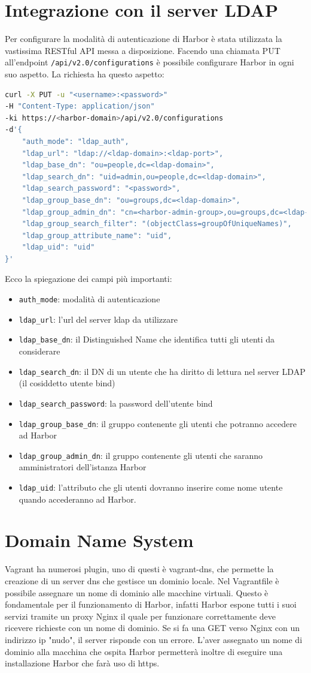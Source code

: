 \documentclass[12pt]{report}
\begin{document}
\section{Integrazione con il server LDAP}
Per configurare la modalità di autenticazione di Harbor è stata utilizzata la vastissima RESTful API messa a disposizione. 
Facendo una chiamata PUT all'endpoint \texttt{/api/v2.0/configurations} è possibile configurare Harbor in ogni suo aspetto. La richiesta ha questo aspetto:
\begin{lstlisting}[language=bash]
curl -X PUT -u "<username>:<password>" 
-H "Content-Type: application/json" 
-ki https://<harbor-domain>/api/v2.0/configurations 
-d'{
    "auth_mode": "ldap_auth",
    "ldap_url": "ldap://<ldap-domain>:<ldap-port>",
    "ldap_base_dn": "ou=people,dc=<ldap-domain>",
    "ldap_search_dn": "uid=admin,ou=people,dc=<ldap-domain>",
    "ldap_search_password": "<password>",
    "ldap_group_base_dn": "ou=groups,dc=<ldap-domain>",
    "ldap_group_admin_dn": "cn=<harbor-admin-group>,ou=groups,dc=<ldap-domain>",
    "ldap_group_search_filter": "(objectClass=groupOfUniqueNames)",
    "ldap_group_attribute_name": "uid",
    "ldap_uid": "uid"
}'
\end{lstlisting}
Ecco la spiegazione dei campi più importanti:
\begin{itemize}
    \item \texttt{auth\_mode}: modalità di autenticazione
    \item \texttt{ldap\_url}: l'url del server ldap da utilizzare
    \item \texttt{ldap\_base\_dn}: il Distinguished Name che identifica tutti gli utenti da considerare
    \item \texttt{ldap\_search\_dn}: il DN di un utente che ha diritto di lettura nel server LDAP (il cosiddetto utente bind)
    \item \texttt{ldap\_search\_password}: la password dell'utente bind
    \item \texttt{ldap\_group\_base\_dn}: il gruppo contenente gli utenti che potranno accedere ad Harbor
    \item \texttt{ldap\_group\_admin\_dn}: il gruppo contenente gli utenti che saranno amministratori dell'istanza Harbor
    \item \texttt{ldap\_uid}: l'attributo che gli utenti dovranno inserire come nome utente quando accederanno ad Harbor. \cite{harbor-auth}
\end{itemize}
\section{Domain Name System}
Vagrant ha numerosi plugin, uno di questi è vagrant-dns, che permette la creazione di un server dns che gestisce un dominio locale. Nel Vagrantfile è possibile assegnare un nome di dominio alle macchine virtuali. Questo è fondamentale per il funzionamento di Harbor, infatti Harbor espone tutti i suoi servizi tramite un proxy Nginx il quale per funzionare correttamente deve ricevere richieste con un nome di dominio. Se si fa una GET verso Nginx con un indirizzo ip "nudo", il server risponde con un errore.
L'aver assegnato un nome di dominio alla macchina che ospita Harbor permetterà inoltre di eseguire una installazione Harbor che farà uso di https.
\end{document}
